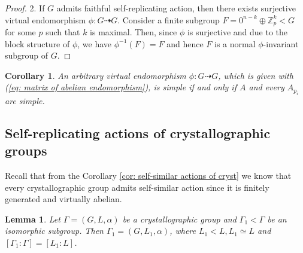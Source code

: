 \documentclass[a4paper,12pt]{amsart}
\newtheorem{lemma}{Lemma}
\newtheorem{corollary}{Corollary}[theorem]
\theoremstyle{definition}
\begin{document}
\begin{proof}
	
	
	2. If $G$ admits faithful self-replicating action, then there exists surjective virtual endomorphism $\phi : G \dashrightarrow G$. Consider a finite subgroup $F = 0^{n-k} \oplus \mathbb{Z}^k_p < G$ for some $p$ such that $k$ is maximal. Then, since $\phi$ is surjective and due to the block structure of $\phi$, we have $\phi^{-1}(F) = F$ and hence $F$ is a normal $\phi$-invariant subgroup of $G$.
	\end{proof}
	
	\begin{corollary}
		An arbitrary virtual endomorphism $\phi : G \dashrightarrow G$, which is given with (\ref{eq: matrix of abelian endomorphism}), is simple if and only if $A$ and every $A_{p_i}$ are simple. 
	\end{corollary}
	
	\subsection{Self-replicating actions of crystallographic groups}
	
	Recall that from the Corollary \ref{cor: self-similar actions of cryst} we know that every crystallographic group admits self-similar action since it is finitely generated and virtually abelian. 
	
	
	\begin{lemma} \label{equal_index}
		Let $\Gamma = (G, L, \alpha)$ be a crystallographic group and $\Gamma_1 < \Gamma$ be an isomorphic subgroup. Then $\Gamma_1 = (G, L_1, \alpha)$, where $L_1 < L, L_1 \simeq L$ and $[\Gamma_1 : \Gamma] = [L_1 : L]$.
	\end{lemma}
	
\end{document}
